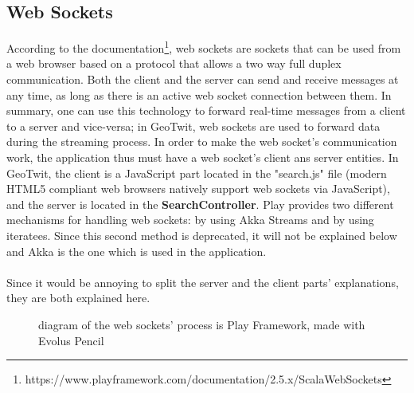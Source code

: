 \documentclass[a4paper,11pt]{report}
\begin{document}
\subsection{Web Sockets}
\label{webSockets}
According to the documentation\footnote{https://www.playframework.com/documentation/2.5.x/ScalaWebSockets}, web sockets are sockets that can be used from a web browser based on a protocol that allows a two way full duplex communication. Both the client and the server can send and receive messages at any time, as long as there is an active web socket connection between them. In summary, one can use this technology to forward real-time messages from a client to a server and vice-versa; in GeoTwit, web sockets are used to forward data during the streaming process.
\newpage
In order to make the web socket's communication work, the application thus must have a web socket's client ans server entities. In GeoTwit, the client is a JavaScript part located in the "search.js" file (modern HTML5 compliant web browsers natively support web sockets via JavaScript), and the server is located in the \textbf{SearchController}. Play provides two different mechanisms for handling web sockets: by using Akka Streams and by using iteratees. Since this second method is deprecated, it will not be explained below and Akka is the one which is used in the application.\\\\
Since it would be annoying to split the server and the client parts' explanations, they are both explained here.
\begin{figure}[H]
\vspace{-5pt}
\begin{center}
\vspace{-20pt}
\caption{diagram of the web sockets' process is Play Framework, made with Evolus Pencil}
\end{center}
\end{figure}
\vspace{-15pt}
\end{document}
